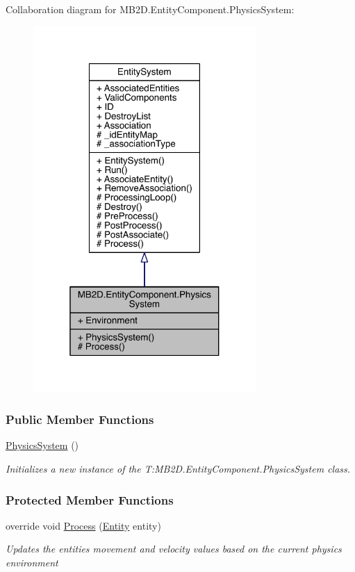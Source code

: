 Collaboration diagram for M\+B2\+D.\+Entity\+Component.\+Physics\+System\+:
\nopagebreak
\begin{figure}[H]
\begin{center}
\leavevmode
\includegraphics[width=241pt]{class_m_b2_d_1_1_entity_component_1_1_physics_system__coll__graph}
\end{center}
\end{figure}
\subsubsection*{Public Member Functions}
\begin{DoxyCompactItemize}
\item 
\hyperlink{class_m_b2_d_1_1_entity_component_1_1_physics_system_a3ab72aac19449619200d2353572b28b0}{Physics\+System} ()
\begin{DoxyCompactList}\small\item\em Initializes a new instance of the T\+:\+M\+B2\+D.\+Entity\+Component.\+Physics\+System class. \end{DoxyCompactList}\end{DoxyCompactItemize}
\subsubsection*{Protected Member Functions}
\begin{DoxyCompactItemize}
\item 
override void \hyperlink{class_m_b2_d_1_1_entity_component_1_1_physics_system_ab8398d3b16f49e684f55649877f645c0}{Process} (\hyperlink{class_m_b2_d_1_1_entity_component_1_1_entity}{Entity} entity)
\begin{DoxyCompactList}\small\item\em Updates the entities movement and velocity values based on the current physics environment \end{DoxyCompactList}\end{DoxyCompactItemize}
